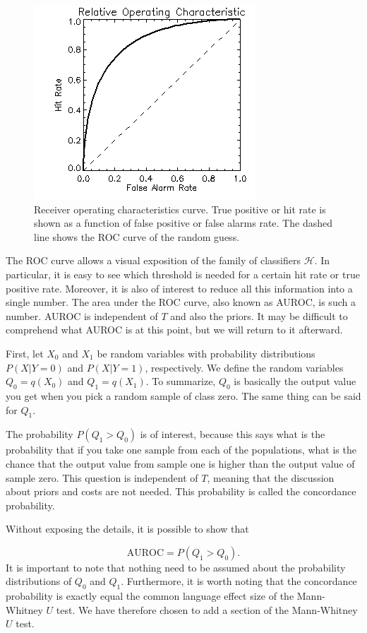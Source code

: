 \begin{figure}[ht!]
\centering
\includegraphics[scale=0.70]{fig/ROC}
\caption{\label{fig:ROC}Receiver operating characteristics curve.  True positive or hit rate is shown as a function of false positive or false alarms rate.  The dashed line shows the ROC curve of the random guess.}
\end{figure}


The ROC curve allows a visual exposition of the family of classifiers $\mathcal{H}$.  In particular, it is easy to see which threshold is needed for a certain hit rate or true positive rate.  Moreover, it is also of interest to reduce all this information into a single number.  The area under the ROC curve, also known as AUROC, is such a number.  
AUROC is independent of $T$ and also the priors.  It may be difficult to comprehend what AUROC is at this point, but we will return to it afterward.

First, let $X_0$ and $X_1$ be random variables with probability distributions $P(X | Y = 0)$ and $P(X | Y = 1)$, respectively.  We define the random variables $Q_0 = q(X_0)$ and $Q_1 = q(X_1)$.  To summarize, $Q_0$ is basically the output value you get when you pick a random sample of class zero. The same thing can be said for $Q_1$.  

The probability $P(Q_1 > Q_0)$ is of interest, because this says what is the probability that if you take one sample from each of the populations, what is the chance that the output value from sample one is higher than the output value of sample zero.  This question is independent of $T$, meaning that the discussion about priors and costs are not needed. This probability is called the concordance probability.

Without exposing the details, it is possible to show that 

\begin{equation}
\label{eq:concurrent}
\mbox{AUROC} = P(Q_1 > Q_0).
\end{equation}
It is important to note that nothing need to be assumed about the probability distributions of $Q_0$ and $Q_1$.  Furthermore, it is worth noting that the concordance probability is exactly equal the common language effect size of the Mann-Whitney $U$ test.  We have therefore chosen to add a section of the Mann-Whitney $U$ test.

